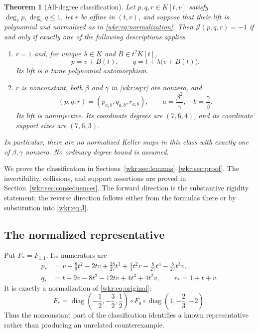 \documentclass[11pt,a4paper]{article}
\numberwithin{equation}{section}
\newtheorem{theorem}{Theorem}[section]
\theoremstyle{definition}
\theoremstyle{remark}
\newcommand{\J}{\mathcal{J}}
\newcommand{\diag}{\operatorname{diag}}
\begin{document}
\begin{theorem}[All-degree classification]\label{wkr:thm:classification}
Let $p,q,r\in K[t,v]$ satisfy $\deg_vp,\deg_vq\le1$, let $r$ be affine in
$(t,v)$, and suppose that their lift is polynomial and normalized as in
\eqref{wkr:eq:normalization}. Then $\J(p,q,r)=-1$ if and only if exactly one
of the following descriptions applies.
\begin{enumerate}[label=\textup{(\Alph*)}]
\item\label{wkr:case:tame} $r=1$ and, for unique $\lambda\in K$ and
$B\in t^2K[t]$,
\begin{equation}\label{wkr:eq:tamepq}
p=v+B(t),\qquad q=t+\lambda\bigl(v+B(t)\bigr).
\end{equation}
Its lift is a tame polynomial automorphism.
\item\label{wkr:case:nonconstant} $r$ is nonconstant, both $\beta$ and $\gamma$
in \eqref{wkr:eq:r} are nonzero, and
\begin{equation}\label{wkr:eq:abrecover}
(p,q,r)=(p_{a,b},q_{a,b},r_{a,b}),\qquad
 a=\frac{\beta^2}{\gamma},\quad b=\frac{\gamma}{\beta}.
\end{equation}
Its lift is noninjective. Its coordinate degrees are $(7,6,4)$, and its
coordinate support sizes are $(7,6,3)$.
\end{enumerate}
In particular, there are no normalized Keller maps in this class with
exactly one of $\beta,\gamma$ nonzero. No ordinary degree bound is assumed.
\end{theorem}

We prove the classification in Sections~\ref{wkr:sec:lemmas}--\ref{wkr:sec:proof}.
The invertibility, collisions, and support assertions are proved in
Section~\ref{wkr:sec:consequences}. The forward direction is the substantive
rigidity statement; the reverse direction follows either from the formulas
there or by substitution into \eqref{wkr:eq:J}.

\subsection{The normalized representative}

Put $F_*=F_{1,1}$. Its numerators are
\begin{align*}
p_*&=v-\frac89t^2-2tv+\frac{28}{27}t^3
       +\frac43t^2v-\frac8{27}t^4-\frac8{27}t^3v,\\
q_*&=t+9v-8t^2-12tv+4t^3+4t^2v,\qquad r_*=1+t+v.
\end{align*}
It is exactly a normalization of \eqref{wkr:eq:original}:
\begin{equation}\label{wkr:eq:originalnormalization}
F_*=\diag\left(-\frac12,-\frac32,\frac12\right)
\circ F_0\circ\diag\left(1,-\frac23,-2\right).
\end{equation}
Thus the nonconstant part of the classification identifies a known
representative rather than producing an unrelated counterexample.
\end{document}
